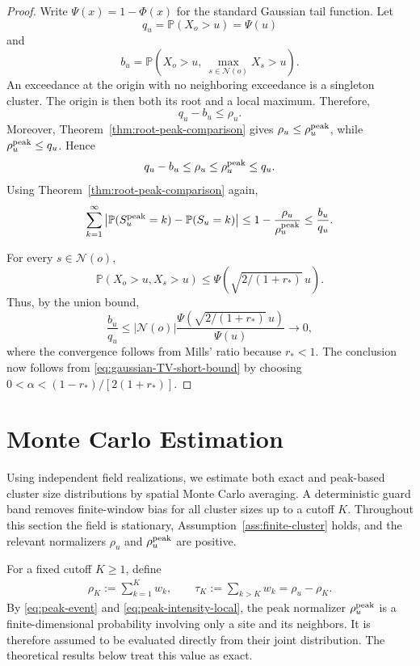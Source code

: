 \documentclass[aap,preprint]{imsart}
\theoremstyle{plain}
\theoremstyle{definition}
\def\P{{\mathbb P}}
\begin{document}
\begin{proof}
	Write $\Psi(x)=1-\Phi(x)$ for the standard Gaussian tail function. Let
	\[
	q_u=\P(X_o>u)=\Psi(u)
	\]
	and
	\[
	b_u
	=
	\P\left(
	X_o>u,\
	\max_{s\in\mathcal N(o)}X_s>u
	\right).
	\]
	An exceedance at the origin with no neighboring exceedance is a singleton
	cluster. The origin is then both its root and a local maximum.
	Therefore,
	\[
	q_u-b_u\leq\rho_u.
	\]
	Moreover, Theorem~\ref{thm:root-peak-comparison} gives
	$\rho_u\leq\rho_u^{\rm peak}$, while
	$\rho_u^{\rm peak}\leq q_u$. Hence
	\[
	q_u-b_u
	\leq\rho_u
	\leq\rho_u^{\rm peak}
	\leq q_u.
	\]
	Using Theorem~\ref{thm:root-peak-comparison} again,
	\begin{equation}\label{eq:gaussian-TV-short-bound}
		\sum_{k=1}^{\infty} \left|
		\P(S_u^{\rm peak}=k)
		-\P(S_u=k)
		\right|
		\leq
		1-\frac{\rho_u}{\rho_u^{\rm peak}}
		\leq
		\frac{b_u}{q_u}.
	\end{equation}
	
	For every
	$s\in\mathcal N(o)$,
	\[
	\P(X_o>u,X_s>u)
	\leq
	\Psi\left(
	\sqrt{2/(1+r_*)}\,u
	\right).
	\]
	Thus, by the union bound,
	\[
	\frac{b_u}{q_u}
	\leq
	|\mathcal N(o)|
	\frac{
		\Psi\left(
		\sqrt{2/(1+r_*)}\,u
		\right)}
	{\Psi(u)}
	\to 0,
	\]
	where the convergence follows from Mills' ratio because $r_*<1$.
	The conclusion now follows from
	\eqref{eq:gaussian-TV-short-bound} by choosing $0<\alpha<(1-r_*)/[2(1+r_*)]$.
\end{proof}

\section{Monte Carlo Estimation}
\label{sec:MC}
Using independent field realizations, we estimate both exact and
peak-based cluster size distributions by spatial Monte Carlo
averaging.  A deterministic guard band removes finite-window bias for all
cluster sizes up to a cutoff $K$.  Throughout this section the field is
stationary, Assumption~\ref{ass:finite-cluster} holds, and the relevant
normalizers $\rho_u$ and $\rho_u^{\rm peak}$ are positive.

For a fixed cutoff $K\geq1$, define
\begin{align*}
	\rho_K:=\sum_{k=1}^K w_k,
	\qquad \tau_K:=\sum_{k>K}w_k=\rho_u-\rho_K.
\end{align*}
By \eqref{eq:peak-event} and \eqref{eq:peak-intensity-local}, the peak normalizer $\rho_u^{\rm peak}$ is a finite-dimensional probability
involving only a site and its neighbors. It is therefore assumed to be evaluated directly from their joint distribution. The theoretical results below treat this value as exact.
\end{document}
